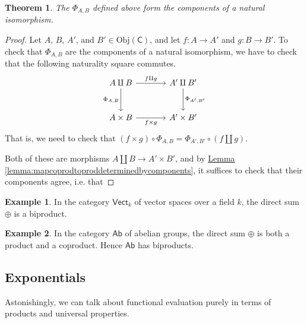 \documentclass[a4paper]{report}
\newcommand{\Obj}{\mathrm{Obj}}
\theoremstyle{definition}
\newtheorem{example}{Example}[section]
\theoremstyle{plain}
\newtheorem{theorem}{Theorem}[section]
\theoremstyle{remark}
\begin{document}
\begin{theorem}
  The $\Phi_{A, B}$ defined above form the components of a natural isomorphism.
\end{theorem}
\begin{proof}
  Let $A$, $B$, $A'$, and $B' \in \Obj(\mathsf{C})$, and let $f\colon A \to A'$ and $g\colon B \to B'$. To check that $\Phi_{A, B}$ are the components of a natural isomorphism, we have to check that the following naturality square commutes.
  \begin{equation*}
    \begin{tikzcd}[column sep=large, row sep=large]
      A \amalg B
      \arrow[r, "f \amalg g"]
      \arrow[d, swap, "{\Phi_{A, B}}"]
      & A' \amalg B'
      \arrow[d, "{\Phi_{A', B'}}"]
      \\
      A \times B
      \arrow[r, swap, "f \times g"]
      & A' \times B'
    \end{tikzcd}
  \end{equation*}
  That is, we need to check that $(f \times g) \circ \Phi_{A, B} = \Phi_{A', B'} \circ (f \amalg g)$.

  Both of these are morphisms $A \amalg B \to A' \times B'$, and by \hyperref[lemma:mapcoprodtoproddeterminedbycomponents]{Lemma \ref*{lemma:mapcoprodtoproddeterminedbycomponents}}, it suffices to check that their components agree, i.e. that 
\end{proof}


\begin{example}
  In the category $\mathsf{Vect}_{k}$ of vector spaces over a field $k$, the direct sum $\oplus$ is a biproduct.
\end{example}

\begin{example}
  In the category $\mathsf{Ab}$ of abelian groups, the direct sum $\oplus$ is both a product and a coproduct. Hence $\mathsf{Ab}$ has biproducts. 
\end{example} 

\subsection{Exponentials}
Astonishingly, we can talk about functional evaluation purely in terms of products and universal properties.
\end{document}
